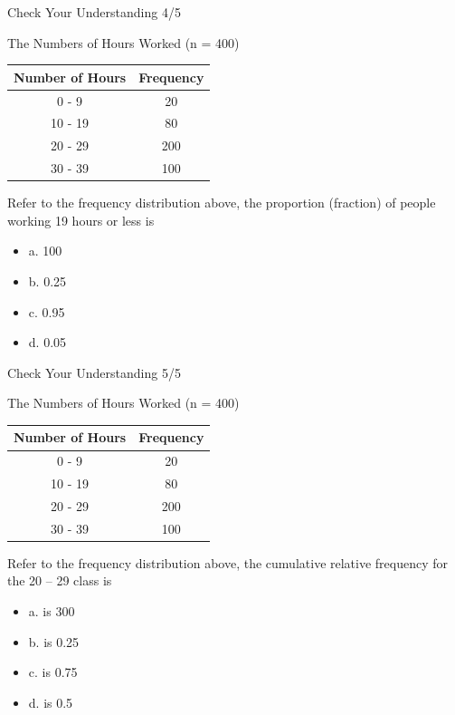 \documentclass{beamer}
\begin{document}
\begin{frame}{Check Your Understanding 4/5}

\begin{center}
The Numbers of Hours Worked (n = 400)
\vspace{0.2 cm}

\begin{tabular}{c|c}
\hline 
Number of Hours & Frequency \\ 
\hline 
0 - 9 & 20 \\ 
\hline 
10 - 19 & 80 \\ 
\hline 
20 - 29 & 200 \\ 
\hline 
30 - 39 & 100 \\ 
\hline 
\end{tabular} 
\end{center}

Refer to the frequency distribution above, the proportion (fraction) of people working 19 hours or less is

\begin{itemize}
\item a.	100
\item b.	0.25
\item c.	0.95
\item d.	0.05

\end{itemize}
\end{frame}


\begin{frame}{Check Your Understanding 5/5}

\begin{center}
The Numbers of Hours Worked (n = 400)
\vspace{0.2 cm}

\begin{tabular}{c|c}
\hline 
Number of Hours & Frequency \\ 
\hline 
0 - 9 & 20 \\ 
\hline 
10 - 19 & 80 \\ 
\hline 
20 - 29 & 200 \\ 
\hline 
30 - 39 & 100 \\ 
\hline 
\end{tabular} 
\end{center}

Refer to the frequency distribution above, the cumulative relative frequency for the 20 – 29 class is

\begin{itemize}
\item a.	is 300
\item b.	is 0.25
\item c.	is 0.75
\item d.	is 0.5

\end{itemize}
\end{frame}
\end{document}
